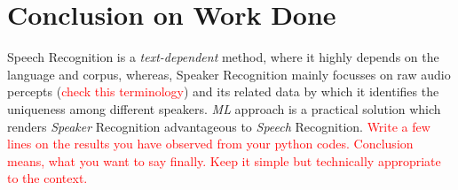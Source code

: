 \documentclass{article}
\begin{document}
\section{\textbf{{Conclusion on Work Done}}}
Speech Recognition is a \textit{text-dependent} method, where it highly depends on the language and corpus, whereas, Speaker Recognition mainly focusses on raw audio percepts (\textcolor{red}{check this terminology}) and its related data by which it identifies the uniqueness among different speakers. \textit{ML} approach is a practical solution which renders \textit{Speaker} Recognition advantageous to \textit{Speech} Recognition. 
\textcolor{red}{Write a few lines on the results you have observed from your python codes. Conclusion means, what you want to say finally. Keep it simple but technically appropriate to the context.}
\end{document}
